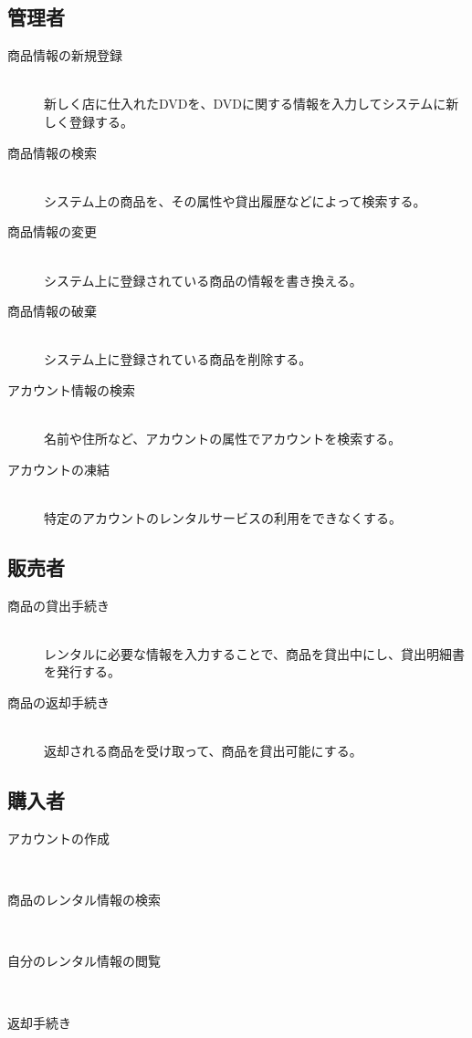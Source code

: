 \documentclass[a4]{jsarticle}
\begin{document}
\begin{itemize}
\subsection{管理者}
\begin{description}
\item[商品情報の新規登録]\\
新しく店に仕入れたDVDを、DVDに関する情報を入力してシステムに新しく登録する。
\item[商品情報の検索]\\
システム上の商品を、その属性や貸出履歴などによって検索する。
\item[商品情報の変更]\\
システム上に登録されている商品の情報を書き換える。
\item[商品情報の破棄]\\
システム上に登録されている商品を削除する。
\item[アカウント情報の検索]\\
名前や住所など、アカウントの属性でアカウントを検索する。
\item[アカウントの凍結]\\
特定のアカウントのレンタルサービスの利用をできなくする。
\end{description}
\subsection{販売者}
\begin{description}
\item[商品の貸出手続き]\\
レンタルに必要な情報を入力することで、商品を貸出中にし、貸出明細書を発行する。
\item[商品の返却手続き]\\
返却される商品を受け取って、商品を貸出可能にする。
\end{description}
\subsection{購入者}
\begin{description}
\item[アカウントの作成]\\
\item[商品のレンタル情報の検索]\\
\item[自分のレンタル情報の閲覧]\\
\item[返却手続き]\\
\end{description}

\end{itemize}
\end{document}
